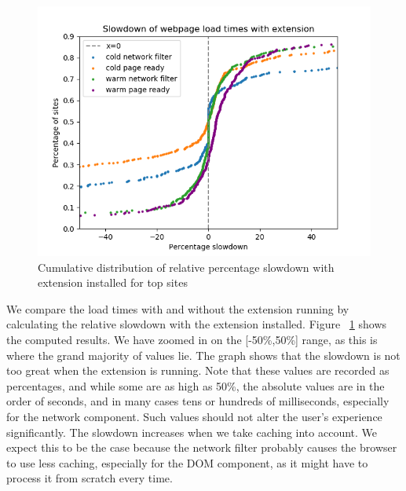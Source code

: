 \begin{figure}[h]
	\includegraphics[scale=0.5]{results/extension_slowdown_overall}
	\caption{Cumulative distribution of relative percentage slowdown with extension installed for top sites}
	\label{fig:overall_slowdown}
\end{figure}

We compare the load times with and without the extension running by calculating the relative slowdown with the extension installed. Figure ~\ref{fig:overall_slowdown} shows the computed results. We have zoomed in on the [-50\%,50\%] range, as this is where the grand majority of values lie. The graph shows that the slowdown is not too great when the extension is running. Note that these values are recorded as percentages, and while some are as high as 50\%, the absolute values are in the order of seconds, and in many cases tens or hundreds of milliseconds, especially for the network component. Such values should not alter the user's experience significantly. The slowdown increases when we take caching into account. We expect this to be the case because the network filter probably causes the browser to use less caching, especially for the DOM component, as it might have to process it from scratch every time.

